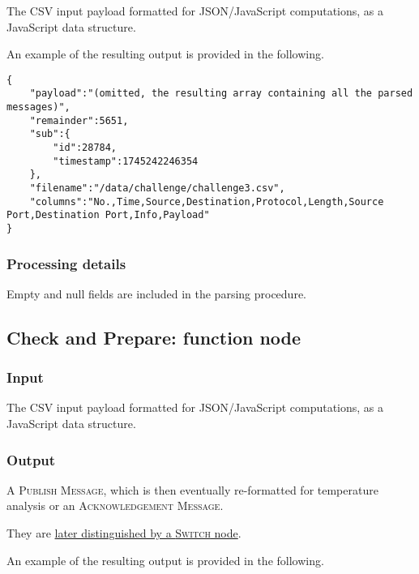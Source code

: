 \documentclass[a4paper,11pt]{article} %
\begin{document}
    The CSV input payload formatted for JSON/JavaScript computations, as a JavaScript data structure.

    \medskip

    An example of the resulting output is provided in the following.

    \begin{verbatim}
{
    "payload":"(omitted, the resulting array containing all the parsed messages)",
    "remainder":5651,
    "sub":{
        "id":28784,
        "timestamp":1745242246354
    },
    "filename":"/data/challenge/challenge3.csv",
    "columns":"No.,Time,Source,Destination,Protocol,Length,Source Port,Destination Port,Info,Payload"
}
    \end{verbatim}

    \subsubsection{Processing details}

    Empty and null fields are included in the parsing procedure.

    \subsection{Check and Prepare: function node}\label{subsec:check-and-prepare:-function-node}

    \subsubsection{Input}

    The CSV input payload formatted for JSON/JavaScript computations, as a JavaScript data structure.

    \subsubsection{Output}

    A \textsc{Publish Message}, which is then eventually re-formatted for temperature analysis or an \textsc{Acknowledgement Message}.

    \smallskip

    They are \hyperref[subsec:distinguish-publish/ack-branches:-switch-node]{later distinguished by a \textsc{Switch} node}.

    \medskip

    An example of the resulting output is provided in the following.
\end{document}
